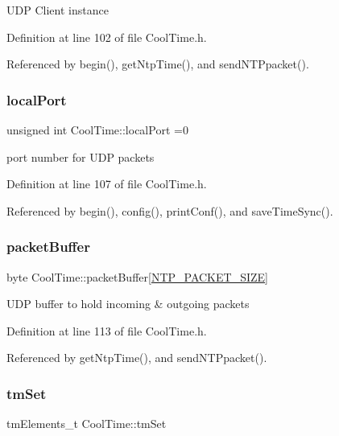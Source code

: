 U\+DP Client instance 

Definition at line 102 of file Cool\+Time.\+h.



Referenced by begin(), get\+Ntp\+Time(), and send\+N\+T\+Ppacket().

\mbox{\label{class_cool_time_a2f777da44d7ba678be8185299e9b49d1}} 
\subsubsection{\texorpdfstring{local\+Port}{localPort}}
{\footnotesize\ttfamily unsigned int Cool\+Time\+::local\+Port =0\hspace{0.3cm}{\ttfamily [private]}}

port number for U\+DP packets 

Definition at line 107 of file Cool\+Time.\+h.



Referenced by begin(), config(), print\+Conf(), and save\+Time\+Sync().

\mbox{\label{class_cool_time_a27e6abc82a5c2f72161956967005bec7}} 
\subsubsection{\texorpdfstring{packet\+Buffer}{packetBuffer}}
{\footnotesize\ttfamily byte Cool\+Time\+::packet\+Buffer\mbox{[}\hyperlink{_cool_time_8h_a56a6ea64006651b4f42adf713e244f06}{N\+T\+P\+\_\+\+P\+A\+C\+K\+E\+T\+\_\+\+S\+I\+ZE}\mbox{]}\hspace{0.3cm}{\ttfamily [private]}}

U\+DP buffer to hold incoming \& outgoing packets 

Definition at line 113 of file Cool\+Time.\+h.



Referenced by get\+Ntp\+Time(), and send\+N\+T\+Ppacket().

\mbox{\label{class_cool_time_ad33c2713c903ff064ad09c46406ae088}} 
\subsubsection{\texorpdfstring{tm\+Set}{tmSet}}
{\footnotesize\ttfamily tm\+Elements\+\_\+t Cool\+Time\+::tm\+Set\hspace{0.3cm}{\ttfamily [private]}}

